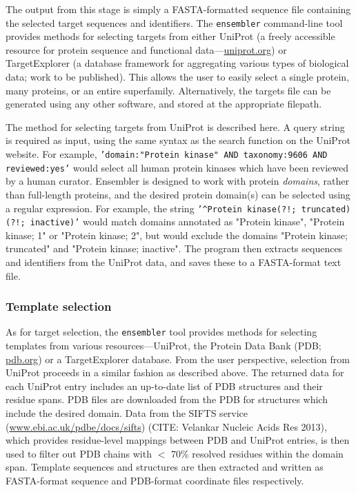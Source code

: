 \documentclass[aps,pre,twocolumn,nofootinbib,superscriptaddress,linenumbers]{revtex4-1}
\begin{document}
The output from this stage is simply a FASTA-formatted sequence file containing
the selected target sequences and identifiers. The {\tt ensembler} command-line
tool provides methods for selecting targets from either UniProt (a freely
accessible resource for protein sequence and functional
data---\href{http://www.uniprot.org/}{uniprot.org}) or TargetExplorer (a
database framework for aggregating various types of biological data; work to be
published). This allows the user to easily select a single protein, many
proteins, or an entire superfamily. Alternatively, the targets file can be
generated using any other software, and stored at the appropriate filepath.

The method for selecting targets from UniProt is described here. A query string
is required as input, using the same syntax as the search function on the
UniProt website. For example, {\tt'domain:"Protein kinase" AND taxonomy:9606
AND reviewed:yes'} would select all human protein kinases which have been
reviewed by a human curator. Ensembler is designed to work with protein
\emph{domains}, rather than full-length proteins, and the desired protein
domain(s) can be selected using a regular expression. For example, the string
{\tt'\^{}Protein kinase(?!; truncated)(?!; inactive)'} would match domains
annotated as "Protein kinase", "Protein kinase; 1" or "Protein kinase; 2", but
would exclude the domains "Protein kinase; truncated" and "Protein kinase;
inactive". The program then extracts sequences and identifiers from the UniProt
data, and saves these to a FASTA-format text file.


\subsubsection{Template selection}

As for target selection, the {\tt ensembler} tool provides methods for
selecting templates from various resources---UniProt, the Protein Data Bank
(PDB; \href{http://www.pdb.org}{pdb.org}) or a TargetExplorer database.  From
the user perspective, selection from UniProt proceeds in a similar fashion as
described above. The returned data for each UniProt entry includes an
up-to-date list of PDB structures and their residue spans. PDB files are
downloaded from the PDB for structures which include the desired domain. Data
from the SIFTS service
(\href{http://www.ebi.ac.uk/pdbe/docs/sifts/}{www.ebi.ac.uk/pdbe/docs/sifts})
(CITE: Velankar Nucleic Acids Res 2013), which provides residue-level mappings
between PDB and UniProt entries, is then used to filter out PDB chains with $<$
70\% resolved residues within the domain span. Template sequences and
structures are then extracted and written as FASTA-format sequence and
PDB-format coordinate files respectively.
\end{document}
